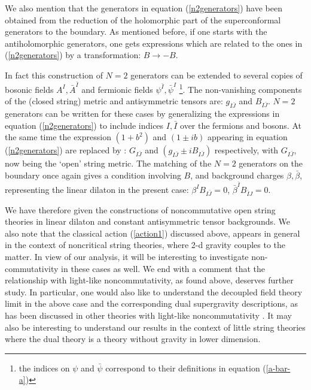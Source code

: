 \documentclass[a4paper,12pt]{article}
\begin{document}
We also mention that the generators in equation 
(\ref{n2generators}) have been obtained from the reduction of the 
holomorphic part of the superconformal generators to the 
boundary. As mentioned before, 
if one starts with the antiholomorphic generators, 
one gets expressions which are related to the ones in 
(\ref{n2generators}) by a transformation: $B \rightarrow - B$. 

In fact this construction of $N=2$ generators can be extended to 
several copies of bosonic fields $A^I, \bar{A}^{\bar{I}}$ and
fermionic fields $\psi^{\bar{I}}, \bar{\psi}^{I}$
\footnote{the indices on $\psi$ and $\bar{\psi}$ correspond
to their definitions in equation (\ref{a-bar-a})}. The 
non-vanishing components of the (closed string) metric and 
antisymmetric tensors are: $g_{I \bar{J}}$ and $B_{I \bar{J}}$. 
$N=2$ generators can be written for these cases by generalizing the 
expressions in equation (\ref{n2generators}) to include indices 
$I, \bar{I}$ over the fermions and bosons. At the same time 
the expression $(1+ b^2)$ and  $(1 \pm i b)$ 
appearing in equation (\ref{n2generators})
are replaced by : $G_{{I} \bar{J}}$ and  
$(g_{I \bar{J}} \pm i B_{I \bar{J}})$ respectively, with $G_{I \bar{J}}$,
now being the `open' string metric. The matching of the $N=2$ 
generators on the boundary once again gives a condition
involving $B$, and  background charges $\beta, \bar{\beta}$, 
representing the  linear dilaton in the present case:
$\beta^I B_{I \bar{J}} = 0$,
$\bar{\beta}^{\bar{I}} B_{\bar{I} J} = 0$.

We have therefore given the constructions of 
noncommutative open string theories in linear 
dilaton and constant antisymmetric tensor backgrounds.
We also note that the classical action (\ref{action1}) 
discussed above, appears in general in the context of noncritical string 
theories\cite{sasha,marn,das,das2}, where 
2-d gravity couples to the matter. In view of our analysis, it 
will be interesting to investigate non-commutativity in these cases
as well. We end with a comment that the relationship 
with light-like noncommutativity, as found above,   
deserves further study. In particular, one would also like to 
understand the decoupled field theory limit \cite{aharony, jabbari,
chen, cai} in the above case and 
the corresponding dual supergravity descriptions, as has been 
discussed in other theories with light-like noncommutativity 
\cite{alishahiha}.  
It may also be interesting to understand our results in the context of 
little string theories \cite{berkooz} where the dual theory is a 
theory without gravity in lower dimension. 
\end{document}
